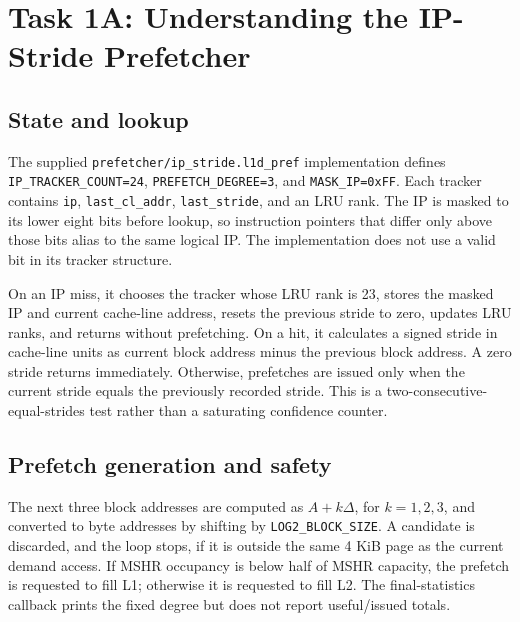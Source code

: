 \section{Task 1A: Understanding the IP-Stride Prefetcher}
\label{sec:task1a}
\subsection{State and lookup}
The supplied \texttt{prefetcher/}\allowbreak\texttt{ip\_stride.l1d\_pref} implementation defines \texttt{IP\_TRACKER\_COUNT=24}, \texttt{PREFETCH\_DEGREE=3}, and \texttt{MASK\_IP=0xFF}. Each tracker contains \texttt{ip}, \texttt{last\_cl\_addr}, \texttt{last\_stride}, and an LRU rank. The IP is masked to its lower eight bits before lookup, so instruction pointers that differ only above those bits alias to the same logical IP. The implementation does not use a valid bit in its tracker structure.

On an IP miss, it chooses the tracker whose LRU rank is 23, stores the masked IP and current cache-line address, resets the previous stride to zero, updates LRU ranks, and returns without prefetching. On a hit, it calculates a signed stride in cache-line units as current block address minus the previous block address. A zero stride returns immediately. Otherwise, prefetches are issued only when the current stride equals the previously recorded stride. This is a two-consecutive-equal-strides test rather than a saturating confidence counter.

\subsection{Prefetch generation and safety}
The next three block addresses are computed as $A + k\Delta$, for $k=1,2,3$, and converted to byte addresses by shifting by \texttt{LOG2\_BLOCK\_SIZE}. A candidate is discarded, and the loop stops, if it is outside the same 4 KiB page as the current demand access. If MSHR occupancy is below half of MSHR capacity, the prefetch is requested to fill L1; otherwise it is requested to fill L2. The final-statistics callback prints the fixed degree but does not report useful/issued totals.

